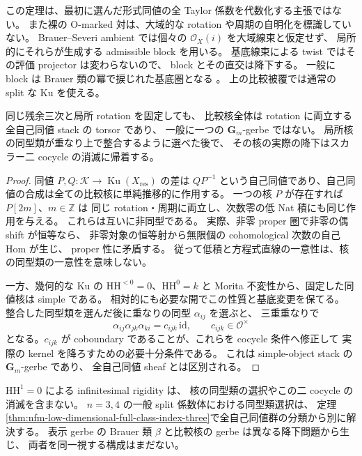 この定理は、最初に選んだ形式同値の全 Taylor 係数を代数化する主張ではない。
また裸の O-marked 対は、大域的な rotation や周期の自明化を標識していない。
Brauer--Severi ambient では個々の $\mathcal O_X(i)$ を大域線束と仮定せず、
局所的にそれらが生成する admissible block を用いる。
基底線束による twist ではその評価 projector は変わらないので、
block とその直交は降下する。
一般に block は Brauer 類の冪で捩じれた基底圏となる
\cite[Theorem~6.2; Remark~6.3]{NFMBerghSchnurer}。
上の比較被覆では通常の split な Ku を使える。

\begin{proposition}[同値核の降下の二段階]
\label{prop:nfm-residual-kernel-descent}
同じ残余三次と局所 rotation を固定しても、
比較核全体は rotation に両立する全自己同値 stack の torsor であり、
一般に一つの $\mathbf G_m$-gerbe ではない。
局所核の同型類が重なり上で整合するように選べた後で、
その核の実際の降下はスカラー二 cocycle の消滅に帰着する。
\end{proposition}

\begin{proof}
同値 $P,Q:\mathcal K\to\operatorname{Ku}(X_{\mathrm{res}})$ の差は
$QP^{-1}$ という自己同値であり、自己同値の合成は全ての比較核に単純推移的に作用する。
一つの核 $P$ が存在すれば $P[2m]$、$m\in\mathbb Z$ は
同じ rotation・周期に両立し、次数零の低 Nat 積にも同じ作用を与える。
これらは互いに非同型である。
実際、非零 proper 圏で非零の偶 shift が恒等なら、
非零対象の恒等射から無限個の cohomological 次数の自己 Hom が生じ、
proper 性に矛盾する。
従って低積と方程式直線の一意性は、核の同型類の一意性を意味しない。

一方、幾何的な Ku の $\mathrm{HH}^{<0}=0$、$\mathrm{HH}^0=k$ と
Morita 不変性から、固定した同値核は simple である。
相対的にも必要な開でこの性質と基底変更を保てる。
整合した同型類を選んだ後に重なりの同型 $\alpha_{ij}$ を選ぶと、
三重重なりで
\[
 \alpha_{ij}\alpha_{jk}\alpha_{ki}
    =c_{ijk}\,\mathrm{id},\qquad c_{ijk}\in\mathcal O^\times
\]
となる。$c_{ijk}$ が coboundary であることが、これらを cocycle 条件へ修正して
実際の kernel を降ろすための必要十分条件である。
これは simple-object stack の $\mathbf G_m$-gerbe
\cite[Corollary~3.22]{NFMToenVaquieModuli}であり、
全自己同値 sheaf \cite[Corollary~3.24]{NFMToenVaquieModuli}とは区別される。
\end{proof}

$\mathrm{HH}^1=0$ による infinitesimal rigidity は、
核の同型類の選択やこの二 cocycle の消滅を含まない。
$n=3,4$ の一般 split 係数体における同型類選択は、
定理\ref{thm:nfm-low-dimensional-full-class-index-three}で全自己同値群の分類から別に解決する。
表示 gerbe の Brauer 類 $\beta$ と比較核の gerbe は異なる降下問題から生じ、
両者を同一視する構成はまだない。

